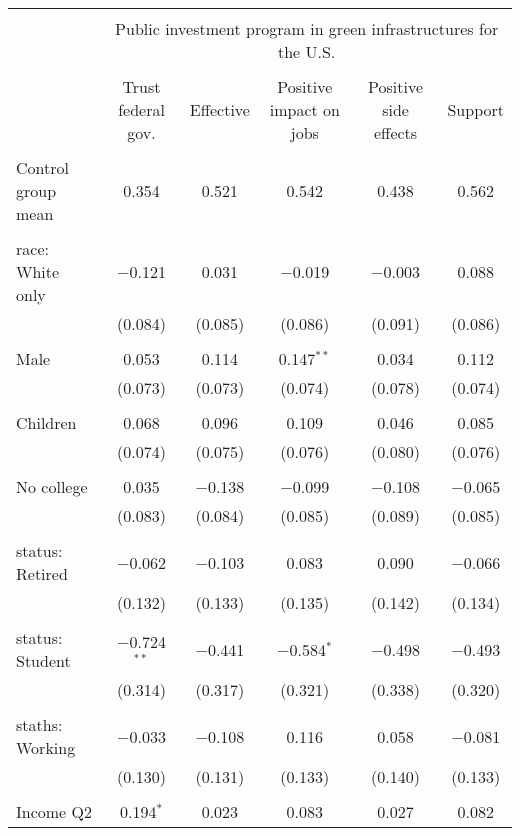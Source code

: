 
\begin{tabular}{@{\extracolsep{5pt}}lccccc} 
\\[-1.8ex]\hline 
\hline \\[-1.8ex] 
 & \multicolumn{5}{c}{Public investment program in green infrastructures for the U.S.} \\ 
\cline{2-6} 
\\[-1.8ex] & Trust federal gov. & Effective & Positive impact on jobs & Positive side effects & Support \\ 
\hline \\[-1.8ex] 
 Control group mean & 0.354 & 0.521 & 0.542 & 0.438 & 0.562  \\ \hline \\[-1.8ex] race: White only & $-$0.121 & 0.031 & $-$0.019 & $-$0.003 & 0.088 \\ 
  & (0.084) & (0.085) & (0.086) & (0.091) & (0.086) \\ 
  & & & & & \\ 
 Male & 0.053 & 0.114 & 0.147$^{**}$ & 0.034 & 0.112 \\ 
  & (0.073) & (0.073) & (0.074) & (0.078) & (0.074) \\ 
  & & & & & \\ 
 Children & 0.068 & 0.096 & 0.109 & 0.046 & 0.085 \\ 
  & (0.074) & (0.075) & (0.076) & (0.080) & (0.076) \\ 
  & & & & & \\ 
 No college & 0.035 & $-$0.138 & $-$0.099 & $-$0.108 & $-$0.065 \\ 
  & (0.083) & (0.084) & (0.085) & (0.089) & (0.085) \\ 
  & & & & & \\ 
 status: Retired & $-$0.062 & $-$0.103 & 0.083 & 0.090 & $-$0.066 \\ 
  & (0.132) & (0.133) & (0.135) & (0.142) & (0.134) \\ 
  & & & & & \\ 
 status: Student & $-$0.724$^{**}$ & $-$0.441 & $-$0.584$^{*}$ & $-$0.498 & $-$0.493 \\ 
  & (0.314) & (0.317) & (0.321) & (0.338) & (0.320) \\ 
  & & & & & \\ 
 staths: Working & $-$0.033 & $-$0.108 & 0.116 & 0.058 & $-$0.081 \\ 
  & (0.130) & (0.131) & (0.133) & (0.140) & (0.133) \\ 
  & & & & & \\ 
 Income Q2 & 0.194$^{*}$ & 0.023 & 0.083 & 0.027 & 0.082 \\ 

\end{tabular}
